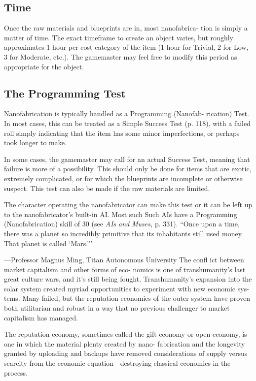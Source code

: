 \subsection{Time}

Once the raw materials and blueprints are in, most nanofabrica-
tion is simply a matter of time. The exact timeframe to create an 
object varies, but roughly approximates 1 hour per cost category of 
the item (1 hour for Trivial, 2 for Low, 3 for Moderate, etc.). The 
gamemaster may feel free to modify this period as appropriate for 
the object.

\subsection{The Programming Test}

Nanofabrication is typically handled as a Programming (Nanofab-
rication) Test. In most cases, this can be treated as a Simple Success 
Test (p. 118), with a failed roll simply indicating that the item has 
some minor imperfections, or perhaps took longer to make.

In some cases, the gamemaster may call for an actual Success Test, 
meaning that failure is more of a possibility. This should only be 
done for items that are exotic, extremely complicated, or for which 
the blueprints are incomplete or otherwise suspect. This test can also 
be made if the raw materials are limited.

The character operating the nanofabricator can make this test or 
it can be left up to the nanofabricator's built-in AI. Most such Such 
AIs have a Programming (Nanofabrication) skill of 30 (see \textit{AIs and }
\textit{Muses,} p. 331).
``Once upon a time, there was a planet so incredibly primitive that its 
inhabitants still used money. That planet is called ‘Mars.'''

—Professor Magnus Ming, Titan Autonomous University
The confl ict between market capitalism and other forms of eco-
nomics is one of transhumanity's last great culture wars, and it's 
still being fought. Transhumanity's expansion into the solar system 
created myriad opportunities to experiment with new economic sys-
tems. Many failed, but the reputation economies of the outer system 
have proven both utilitarian and robust in a way that no previous 
challenger to market capitalism has managed.

The reputation economy, sometimes called the gift economy or 
open economy, is one in which the material plenty created by nano-
fabrication and the longevity granted by uploading and backups 
have removed considerations of supply versus scarcity from the 
economic equation—destroying classical economics in the process.

